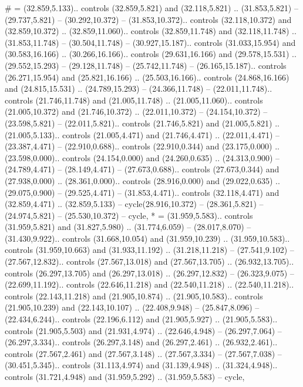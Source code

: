 {\#} = {(32.859,5.133).. controls (32.859,5.821) and (32.118,5.821) .. (31.853,5.821) -- (29.737,5.821) -- (30.292,10.372) -- (31.853,10.372).. controls (32.118,10.372) and (32.859,10.372) .. (32.859,11.060).. controls (32.859,11.748) and (32.118,11.748) .. (31.853,11.748) -- (30.504,11.748) -- (30.927,15.187).. controls (31.033,15.954) and (30.583,16.166) .. (30.266,16.166).. controls (29.631,16.166) and (29.578,15.531) .. (29.552,15.293) -- (29.128,11.748) -- (25.742,11.748) -- (26.165,15.187).. controls (26.271,15.954) and (25.821,16.166) .. (25.503,16.166).. controls (24.868,16.166) and (24.815,15.531) .. (24.789,15.293) -- (24.366,11.748) -- (22.011,11.748).. controls (21.746,11.748) and (21.005,11.748) .. (21.005,11.060).. controls (21.005,10.372) and (21.746,10.372) .. (22.011,10.372) -- (24.154,10.372) -- (23.598,5.821) -- (22.011,5.821).. controls (21.746,5.821) and (21.005,5.821) .. (21.005,5.133).. controls (21.005,4.471) and (21.746,4.471) .. (22.011,4.471) -- (23.387,4.471) -- (22.910,0.688).. controls (22.910,0.344) and (23.175,0.000) .. (23.598,0.000).. controls (24.154,0.000) and (24.260,0.635) .. (24.313,0.900) -- (24.789,4.471) -- (28.149,4.471) -- (27.673,0.688).. controls (27.673,0.344) and (27.938,0.000) .. (28.361,0.000).. controls (28.916,0.000) and (29.022,0.635) .. (29.075,0.900) -- (29.525,4.471) -- (31.853,4.471).. controls (32.118,4.471) and (32.859,4.471) .. (32.859,5.133) -- cycle(28.916,10.372) -- (28.361,5.821) -- (24.974,5.821) -- (25.530,10.372) -- cycle},
{*} = {(31.959,5.583).. controls (31.959,5.821) and (31.827,5.980) .. (31.774,6.059) -- (28.017,8.070) -- (31.430,9.922).. controls (31.668,10.054) and (31.959,10.239) .. (31.959,10.583).. controls (31.959,10.663) and (31.933,11.192) .. (31.218,11.218) -- (27.541,9.102) -- (27.567,12.832).. controls (27.567,13.018) and (27.567,13.705) .. (26.932,13.705).. controls (26.297,13.705) and (26.297,13.018) .. (26.297,12.832) -- (26.323,9.075) -- (22.699,11.192).. controls (22.646,11.218) and (22.540,11.218) .. (22.540,11.218).. controls (22.143,11.218) and (21.905,10.874) .. (21.905,10.583).. controls (21.905,10.239) and (22.143,10.107) .. (22.408,9.948) -- (25.847,8.096) -- (22.434,6.244).. controls (22.196,6.112) and (21.905,5.927) .. (21.905,5.583).. controls (21.905,5.503) and (21.931,4.974) .. (22.646,4.948) -- (26.297,7.064) -- (26.297,3.334).. controls (26.297,3.148) and (26.297,2.461) .. (26.932,2.461).. controls (27.567,2.461) and (27.567,3.148) .. (27.567,3.334) -- (27.567,7.038) -- (30.451,5.345).. controls (31.113,4.974) and (31.139,4.948) .. (31.324,4.948).. controls (31.721,4.948) and (31.959,5.292) .. (31.959,5.583) -- cycle},
